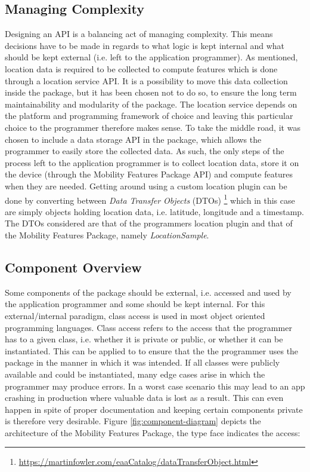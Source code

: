 \subsection{Managing Complexity}
Designing an API is a balancing act of managing complexity. This means decisions have to be made in regards to what logic is kept internal and what should be kept external (i.e. left to the application programmer). As mentioned, location data is required to be collected to compute features which is done through a location service API. It is a possibility to move this data collection inside the package, but it has been chosen not to do so, to ensure the long term maintainability and modularity of the package. The location service depends on the platform and programming framework of choice and leaving this particular choice to the programmer therefore makes sense. To take the middle road, it was chosen to include a data storage API in the package, which allows the programmer to easily store the collected data. As such, the only steps of the process left to the application programmer is to collect location data, store it on the device (through the Mobility Features Package API) and compute features when they are needed. Getting around using a custom location plugin can be done by converting between \textit{Data Transfer Objects} (DTOs) \footnote{\url{https://martinfowler.com/eaaCatalog/dataTransferObject.html}} which in this case are simply objects holding location data, i.e. latitude, longitude and a timestamp. The DTOs considered are that of the programmers location plugin and that of the Mobility Features Package, namely \textit{LocationSample}.

\subsection{Component Overview}
Some components of the package should be external, i.e. accessed and used by the application programmer and some should be kept internal. For this external/internal paradigm, class access is used in most object oriented programming languages. Class access refers to the access that the programmer has to a given class, i.e. whether it is private or public, or whether it can be instantiated. This can be applied to to ensure that the the programmer uses the package in the manner in which it was intended. If all classes were publicly available and could be instantiated, many edge cases arise in which the programmer may produce errors. In a worst case scenario this may lead to an app  crashing in production where valuable data is lost as a result. This can even happen in spite of proper documentation and keeping certain components private is therefore very desirable. Figure \ref{fig:component-diagram} depicts the architecture of the Mobility Features Package, the type face indicates the access: 
 

